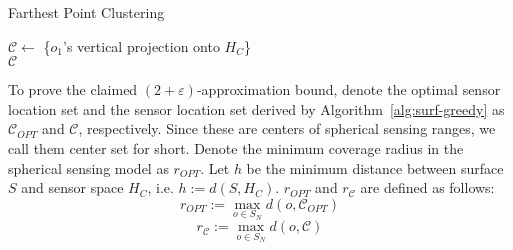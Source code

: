 \begin{algorithm}
\begin{small}
    \caption{Farthest Point Clustering}
		\label{alg:surf-greedy}
    \SetAlgoLined
		\vspace{1mm}
		\vspace{1mm}
        $\mathcal{C} \leftarrow$  \{$o_1$'s vertical projection onto $H_C$\}\\
        \Return $\mathcal{C}$
\end{small}
\end{algorithm}

To prove the claimed $(2+\varepsilon)$-approximation bound,  
denote the optimal sensor location set and the sensor location set derived by Algorithm~\ref{alg:surf-greedy} as $\mathcal{C}_{OPT}$ and $\mathcal{C}$, respectively. Since these are centers of spherical sensing ranges, we call them center set for short. Denote the minimum coverage radius in the spherical sensing model as $r_{OPT}$. Let $h$ be the minimum distance between surface $S$ and sensor space $H_C$, i.e. $h:=d(S,H_C)$. $r_{OPT}$ and $r_{\mathcal{C}}$ are defined as follows:
\begin{equation}
    r_{OPT}:=\max_{o\in S_N} d(o, \mathcal{C}_{OPT})
\end{equation}
\begin{equation}
    r_{\mathcal{C}}:=\max_{o\in S_N} d(o, \mathcal{\mathcal{C}})
\end{equation}

